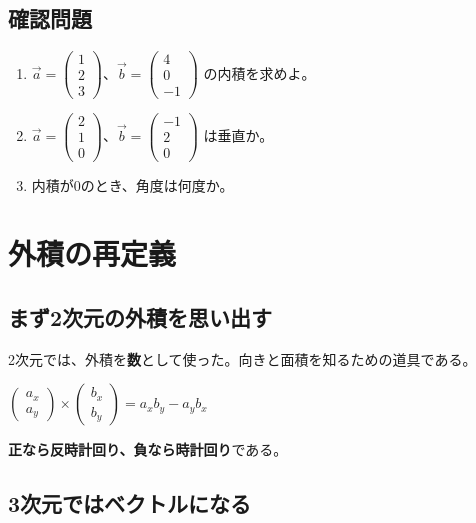 \documentclass[paper=a4,fleqn]{jlreq}
\newcommand{\formula}[1]{%
  \vspace{4pt}%
  \begin{center}{\large\bfseries\boldmath\(\displaystyle #1\)}\end{center}%
  \vspace{4pt}%
}
\begin{document}
\subsection{確認問題}
\begin{enumerate}
  \item \(\vec{a}=\begin{pmatrix}1\\2\\3\end{pmatrix}\)、\(\vec{b}=\begin{pmatrix}4\\0\\-1\end{pmatrix}\) の内積を求めよ。
  \item \(\vec{a}=\begin{pmatrix}2\\1\\0\end{pmatrix}\)、\(\vec{b}=\begin{pmatrix}-1\\2\\0\end{pmatrix}\) は垂直か。
  \item 内積が0のとき、角度は何度か。
\end{enumerate}

\section{外積の再定義}

\subsection{まず2次元の外積を思い出す}

2次元では、外積を\textbf{数}として使った。向きと面積を知るための道具である。

\formula{\begin{pmatrix}a_x\\a_y\end{pmatrix}\times\begin{pmatrix}b_x\\b_y\end{pmatrix}=a_xb_y-a_yb_x}

\textbf{正なら反時計回り、負なら時計回り}である。

\subsection{3次元ではベクトルになる}
\end{document}

